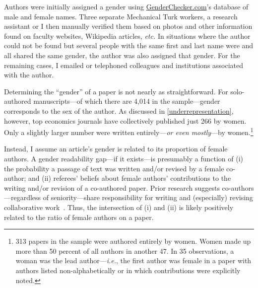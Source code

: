 Authors were initially assigned a gender using \href{http://genderchecker.com}{GenderChecker.com}'s database of male and female names. Three separate Mechanical Turk workers, a research assistant or I then manually verified them based on photos and other information found on faculty websites, Wikipedia articles, \emph{etc.} In situations where the author could not be found but several people with the same first and last name were and all shared the same gender, the author was also assigned that gender. For the remaining cases, I emailed or telephoned colleagues and institutions associated with the author.

Determining the ``gender'' of a paper is not nearly as straightforward. For solo-authored manu\-scripts---of which there are 4,014 in the sample---gender corresponds to the sex of the author. As discussed in \autoref{underrepresentation}, however, top economics journals have collectively published just 266 by women. Only a slightly larger number were written entirely---\emph{or even mostly}---by women.\footnote{313 papers in the sample were authored entirely by women. Women made up more than 50 percent of all authors in another 47. In 35 observations, a woman was the lead author---\emph{i.e.}, the first author was female in a paper with authors listed non-alphabetically or in which contributions were explicitly noted.}



Instead, I assume an article's gender is related to its proportion of female authors. A gender readability gap---if it exists---is presumably a function of (i) the probability a passage of text was written and\slash or revised by a female co-author; and (ii) referees' beliefs about female authors' contributions to the writing and\slash or revision of a co-authored paper. Prior research suggests co-authors---regardless of seniority---share responsibility for writing and (especially) revising collaborative work~\citep[see, \emph{e.g.}, ][]{Hart2000a,Kumar2016}. Thus, the intersection of (i) and (ii) is likely positively related to the ratio of female authors on a paper.

